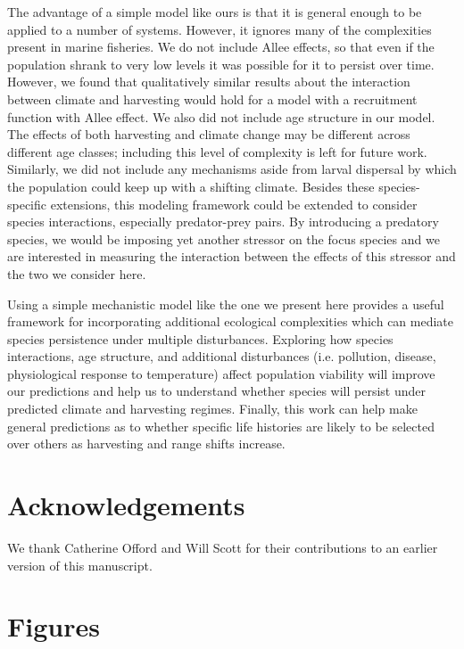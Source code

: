 \documentclass[12pt,english]{article}
\begin{document}
\begin{spacing}{1.9}
\begin{flushleft}
The advantage of a simple model like ours is that it is general enough to be applied to a number of systems.  However, it  ignores many of the complexities present in marine fisheries. We do not include Allee effects, so that even if the population shrank to very low levels it was possible for it to persist over time. However, we found that qualitatively similar results about the interaction between climate and harvesting would hold for a model with a recruitment function with Allee effect. We also did not include age structure in our model. The effects of both harvesting and climate change may be different across different age classes; including this level of complexity is left for future work. Similarly, we did not include any mechanisms aside from larval dispersal by which the population could keep up with a shifting climate.  Besides these species-specific extensions, this modeling framework could be extended to consider species interactions, especially predator-prey pairs.  By introducing a predatory species, we would be imposing yet another stressor on the focus species \citep{Lingetal2009, Gurevitchetal2000}and we are interested in measuring the interaction between the effects of this stressor and the two we consider here.

Using a simple mechanistic model like the one we present here provides a useful framework for incorporating additional ecological complexities which can mediate species persistence under multiple disturbances. Exploring how species interactions, age structure, and additional disturbances (i.e. pollution, disease, physiological response to temperature) affect population viability will improve our predictions and help us to understand whether species will persist under predicted climate and harvesting regimes. Finally, this work can help make general predictions as to whether specific life histories are likely to be selected over others as harvesting and range shifts increase.


\section*{ Acknowledgements}
We thank Catherine Offord and Will Scott for their contributions to an earlier version of this manuscript. 

\end{flushleft}
\end{spacing}


\pagebreak
\section{Figures}
\end{document}
